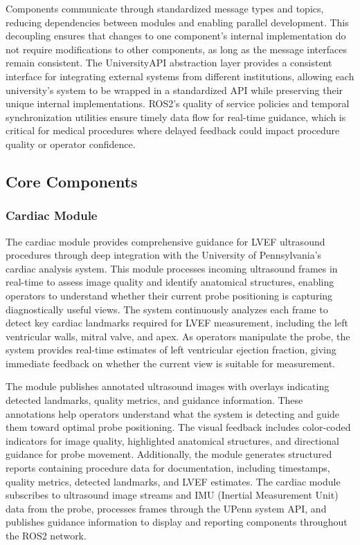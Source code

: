 \documentclass[12pt,a4paper]{article}
\begin{document}
Components communicate through standardized message types and topics, reducing dependencies between modules and enabling parallel development. This decoupling ensures that changes to one component's internal implementation do not require modifications to other components, as long as the message interfaces remain consistent. The UniversityAPI abstraction layer provides a consistent interface for integrating external systems from different institutions, allowing each university's system to be wrapped in a standardized API while preserving their unique internal implementations. ROS2's quality of service policies and temporal synchronization utilities ensure timely data flow for real-time guidance, which is critical for medical procedures where delayed feedback could impact procedure quality or operator confidence.

\subsection{Core Components}

\subsubsection{Cardiac Module}

The cardiac module provides comprehensive guidance for LVEF ultrasound procedures through deep integration with the University of Pennsylvania's cardiac analysis system. This module processes incoming ultrasound frames in real-time to assess image quality and identify anatomical structures, enabling operators to understand whether their current probe positioning is capturing diagnostically useful views. The system continuously analyzes each frame to detect key cardiac landmarks required for LVEF measurement, including the left ventricular walls, mitral valve, and apex. As operators manipulate the probe, the system provides real-time estimates of left ventricular ejection fraction, giving immediate feedback on whether the current view is suitable for measurement.

The module publishes annotated ultrasound images with overlays indicating detected landmarks, quality metrics, and guidance information. These annotations help operators understand what the system is detecting and guide them toward optimal probe positioning. The visual feedback includes color-coded indicators for image quality, highlighted anatomical structures, and directional guidance for probe movement. Additionally, the module generates structured reports containing procedure data for documentation, including timestamps, quality metrics, detected landmarks, and LVEF estimates. The cardiac module subscribes to ultrasound image streams and IMU (Inertial Measurement Unit) data from the probe, processes frames through the UPenn system API, and publishes guidance information to display and reporting components throughout the ROS2 network.
\end{document}
